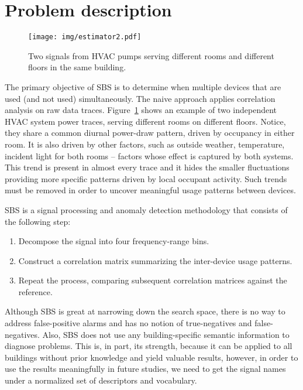 
\section{Problem description}

\begin{figure}[t!]
 \texttt{[image: img/estimator2.pdf]}
 \caption{Two signals from HVAC pumps serving different rooms and different floors in the same building.}
 \label{fig:diagram1}
\end{figure}

The primary objective of SBS is to determine when multiple devices that are used (and not used) simultaneously.
The naive approach applies correlation analysis on raw data traces.  Figure~\ref{fig:diagram1} shows an example of 
two independent HVAC system power traces, serving different rooms on different floors.  Notice, they share a common diurnal power-draw
pattern, driven by occupancy in either room.  It is also driven by other factors, such as outside weather, temperature, incident light for
both rooms -- factors whose effect is captured by both systems.   
This trend is present in almost every trace and it hides 
the smaller fluctuations providing more specific patterns driven by local occupant activity.  
Such trends must be removed in order to uncover meaningful usage patterns between devices.

SBS is a signal processing and anomaly detection methodology that consists of the following step:

\begin{enumerate}
\item Decompose the signal into four frequency-range bins.
\item Construct a correlation matrix summarizing the inter-device usage patterns.
\item Repeat the process, comparing subsequent correlation matrices against the reference.
\end{enumerate}

Although SBS is great at narrowing down the search space, there is no way to address false-positive alarms and
has no notion of true-negatives and false-negatives.  Also, SBS does not use any building-specific semantic information
to diagnose problems.  This is, in part, its strength, because it can be applied to all buildings without prior knowledge
and yield valuable results, however, in order to use the results meaningfully in future studies, we need to 
get the signal names under a normalized set of descriptors and vocabulary.